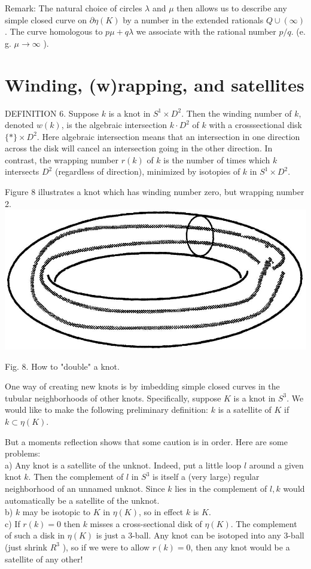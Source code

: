 \documentclass[10pt, letterpaper]{article}
\begin{document}
Remark: The natural choice of circles $\lambda$ and $\mu$ then allows us to describe any simple closed curve on $\partial \eta(K)$ by a number in the extended rationals $Q \cup(\infty)$. The curve homologous to $p \mu+q \lambda$ we associate with the rational number $p / q$. (e. g. $\mu \rightarrow \infty$ ).



\section{Winding, (w)rapping, and satellites}

DEFINITION 6. Suppose $k$ is a knot in $S^{1} \times D^{2}$. Then the winding number of $k$, denoted $w(k)$, is the algebraic intersection $k \cdot D^{2}$ of $k$ with a crosssectional disk $\{*\} \times D^{2}$. Here algebraic intersection means that an intersection in one direction across the disk will cancel an intersection going in the other direction. In contrast, the wrapping number $r(k)$ of $k$ is the number of times which $k$ intersects $D^{2}$ (regardless of direction), minimized by isotopies of $k$ in $S^{1} \times D^{2}$.

Figure 8 illustrates a knot which has winding number zero, but wrapping number 2.\\
\includegraphics[scale=0.2, center]{2025_05_21_037de704f595ce642d3eg-081}

Fig. 8. How to "double" a knot.

One way of creating new knots is by imbedding simple closed curves in the tubular neighborhoods of other knots. Specifically, suppose $K$ is a knot in $S^{3}$. We would like to make the following preliminary definition: $k$ is a satellite of $K$ if $k \subset \eta(K)$.

But a moments reflection shows that some caution is in order. Here are some problems:\\
a) Any knot is a satellite of the unknot. Indeed, put a little loop $l$ around a given knot $k$. Then the complement of $l$ in $S^{3}$ is itself a (very large) regular neighborhood of an unnamed unknot. Since $k$ lies in the complement of $l, k$ would automatically be a satellite of the unknot.\\
b) $k$ may be isotopic to $K$ in $\eta(K)$, so in effect $k$ is $K$.\\
c) If $r(k)=0$ then $k$ misses a cross-sectional disk of $\eta(K)$. The complement of such a disk in $\eta(K)$ is just a 3-ball. Any knot can be isotoped into any 3-ball (just shrink $R^{3}$ ), so if we were to allow $r(k)=0$, then any knot would be a satellite of any other!
\end{document}
